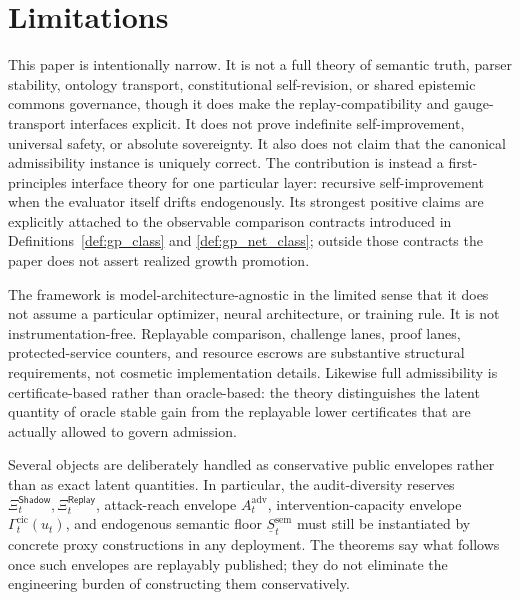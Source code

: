 \documentclass[11pt]{article}
\theoremstyle{definition}
\newcommand{\1}{\mathbf{1}}
\newcommand{\Shadow}{\mathsf{Shadow}}
\newcommand{\Replay}{\mathsf{Replay}}
\begin{document}
\section{Limitations}
This paper is intentionally narrow. It is not a full theory of semantic truth, parser stability, ontology transport, constitutional self-revision, or shared epistemic commons governance, though it does make the replay-compatibility and gauge-transport interfaces explicit. It does not prove indefinite self-improvement, universal safety, or absolute sovereignty. It also does not claim that the canonical admissibility instance is uniquely correct. The contribution is instead a first-principles interface theory for one particular layer: recursive self-improvement when the evaluator itself drifts endogenously. Its strongest positive claims are explicitly attached to the observable comparison contracts introduced in Definitions~\ref{def:gp_class} and \ref{def:gp_net_class}; outside those contracts the paper does not assert realized growth promotion.

The framework is model-architecture-agnostic in the limited sense that it does not assume a particular optimizer, neural architecture, or training rule. It is not instrumentation-free. Replayable comparison, challenge lanes, proof lanes, protected-service counters, and resource escrows are substantive structural requirements, not cosmetic implementation details. Likewise full admissibility is certificate-based rather than oracle-based: the theory distinguishes the latent quantity of oracle stable gain from the replayable lower certificates that are actually allowed to govern admission.

Several objects are deliberately handled as conservative public envelopes rather than as exact latent quantities. In particular, the audit-diversity reserves $\Xi_t^{\Shadow},\Xi_t^{\Replay}$, attack-reach envelope $A_t^{\mathrm{adv}}$, intervention-capacity envelope $\Gamma_t^{\mathrm{cic}}(u_t)$, and endogenous semantic floor $\underline S_t^{\mathrm{sem}}$ must still be instantiated by concrete proxy constructions in any deployment. The theorems say what follows once such envelopes are replayably published; they do not eliminate the engineering burden of constructing them conservatively.
\end{document}
